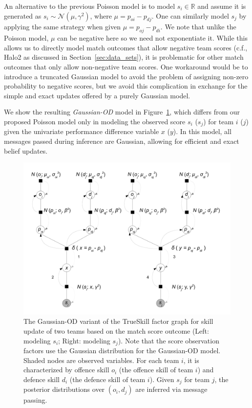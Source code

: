 An alternative to the previous Poisson model is to
model $s_i \in \mathbb{R}$ and assume it
is generated as $s_{i}\sim \mathcal{N}(\mu, \gamma^2)$,
where $\mu = p_{oi}-p_{dj}$.  One can similarly
model $s_j$ by applying the same strategy when given $\mu = p_{oj} -
p_{di}$.  We note that unlike the Poisson model, $\mu$ can be negative
here so we need not exponentiate it.  While this allows us to directly
model match outcomes that allow negative team scores (c.f., Halo2 as
discussed in Section~\ref{sec:data_sets}), it is problematic for other
match outcomes that only allow non-negative team scores.  One
workaround would be to introduce a truncated Gaussian model to avoid
the problem of assigning non-zero probability to negative scores, but
we avoid this complication in exchange for the simple and exact
updates offered by a purely Gaussian model.

We show the resulting \emph{Gaussian-OD} model in
Figure~\ref{fig:GaussianOD}, which
differs from our proposed Poisson model only in modeling the observed score $s_i$ ($s_j$) for team $i$ ($j$) given the univariate performance difference variable $x$ ($y$). In this model, all messages passed during inference
are Gaussian, allowing for efficient and exact belief updates.


\begin{figure}[t!]
\centerline{\includegraphics[scale=0.28]{modelAndInferenceGaussianGraphicalModel}}
\caption{
The Gaussian-OD variant of the TrueSkill factor graph for skill update of two teams based on the match score outcome (Left: modeling $s_i$; Right: modeling $s_j$). Note that the score observation factors use the Gaussian distribution for the Gaussian-OD model. Shaded nodes are observed variables. For each team $i$, it is characterized by offence skill $o_{i}$ (the offence skill of team $i$) and defence skill $d_{i}$ (the defence skill of
team $i$). Given $s_j$ for team $j$, the posterior distributions over $(o_i,d_j)$ are inferred via message passing.
}
\label{fig:GaussianOD}
\end{figure}


